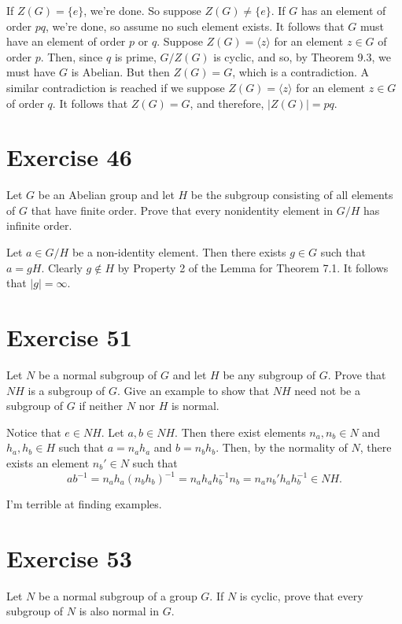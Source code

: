 \documentclass[12pt]{article}
\begin{document}
If $Z(G)=\{e\}$, we're done.  So suppose $Z(G)\neq\{e\}$.
If $G$ has an element of order $pq$, we're done,
so assume no such element exists.  It follows that
$G$ must have an element of order $p$ or $q$.  Suppose
$Z(G)=\langle z\rangle$ for an element $z\in G$ of
order $p$.  Then, since $q$ is prime, $G/Z(G)$ is cyclic,
and so, by Theorem 9.3, we must have $G$ is Abelian.
But then $Z(G)=G$, which is a contradiction.
A similar contradiction is reached if we suppose $Z(G)=\langle z\rangle$
for an element $z\in G$ of order $q$.  It follows that $Z(G)=G$,
and therefore, $|Z(G)|=pq$.

\section*{Exercise 46}

Let $G$ be an Abelian group and let $H$ be the subgroup consisting
of all elements of $G$ that have finite order.  Prove that every nonidentity
element in $G/H$ has infinite order.

Let $a\in G/H$ be a non-identity element.  Then there exists $g\in G$ such
that $a=gH$.  Clearly $g\not\in H$ by Property 2 of the Lemma for Theorem 7.1.
It follows that $|g|=\infty$.

\section*{Exercise 51}

Let $N$ be a normal subgroup of $G$ and let $H$
be any subgroup of $G$.  Prove that $NH$ is a subgroup of $G$.
Give an example to show that $NH$ need not be a subgroup of $G$ if neither
$N$ nor $H$ is normal.

Notice that $e\in NH$.  Let $a,b\in NH$.  Then there exist
elements $n_a,n_b\in N$ and $h_a,h_b\in H$ such that $a=n_ah_a$
and $b=n_bh_b$.  Then, by the normality of $N$, there exists
an element $n_b'\in N$ such that
\begin{equation*}
ab^{-1}=n_ah_a(n_bh_b)^{-1}=n_ah_ah_b^{-1}n_b=n_an_b'h_ah_b^{-1}\in NH.
\end{equation*}

I'm terrible at finding examples.

\section*{Exercise 53}

Let $N$ be a normal subgroup of a group $G$.  If $N$ is cyclic,
prove that every subgroup of $N$ is also normal in $G$.
\end{document}
